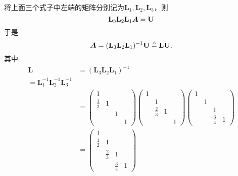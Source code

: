 \begin{jie}[续]
        将上面三个式子中左端的矩阵分别记为$\mathbf{L}_1,\mathbf{L}_2,\mathbf{L}_3$，则
        $$
        \mathbf{L}_3\mathbf{L}_2\mathbf{L}_1 \boldsymbol{A} = \mathbf{U}
        $$ 
  于是
  $$
  \boldsymbol{A} = (\mathbf{L}_3\mathbf{L}_2\mathbf{L}_1)^{-1}\mathbf{U} \triangleq \mathbf{L}\mathbf{U},
  $$
  其中
  $$
  \begin{aligned}
    \mathbf{L}
    &=  (\mathbf{L}_3\mathbf{L}_2\mathbf{L}_1)^{-1} \\ =  \mathbf{L}_1^{-1}\mathbf{L}_2^{-1}\mathbf{L}_3^{-1}\\ 
    &=   
        \left(
        \begin{array}{cccc}
          1 & && \\
          \frac12 &1&&\\
            &&1&\\
            &&&1
        \end{array}
                \right)
                \left(
                \begin{array}{cccc}
                  1 & && \\
                    &1&&\\
                    &\frac23&1&\\
                    &&&1
                \end{array}
                        \right)
                        \left(
                        \begin{array}{cccc}
                          1 & && \\
                            &1&&\\
                            &&1&\\
                            &&\frac34&1
                        \end{array}
                                       \right) \\ 
    &=   \left(
        \begin{array}{cccc}
          1 & && \\
          \frac12 &1&&\\
            &\frac23&1&\\
            &&\frac34&1
        \end{array}
                       \right)
  \end{aligned}    
  $$
\end{jie}
 


 



